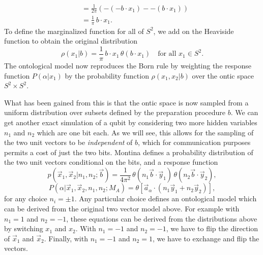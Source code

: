\documentclass[12pt,draft]{article}
\theoremstyle{definition}
\theoremstyle{plain}
\begin{document}
{\begin{align}
            &= \frac{1}{2\pi} \left( 
                -(-b \cdot x_1) - -(b \cdot x_1)
            \right) \\
            &= \frac{1}{\pi} \, b \cdot x_1.
        \end{align}
        To define the marginalized function for all of
        $S^2$, we add on the Heaviside function to obtain
        the original distribution
        \begin{equation}
            \rho(x_1 | b)
            = \frac{1}{\pi} \, b \cdot x_1 \, \theta(b \cdot
            x_1)
            \quad
            \text{for all } x_1 \in S^2.
        \end{equation}
        The ontological model now reproduces the Born rule
        by weighting the response function $P(\alpha|x_1)$ 
        by the probability function $\rho(x_1,x_2|b)$ over
        the ontic space $S^2 \times S^2$.
    }

    What has been gained from this is that the ontic space
    is now sampled from a uniform distribution over subsets
    defined by the preparation procedure $b$. We can get
    another exact simulation of a qubit by considering two
    more hidden variables $n_1$ and $n_2$ which are one bit
    each. As we will see, this allows for the sampling of
    the two unit vectors to be \textit{independent} of $b$,
    which for communication purposes permits a cost of just
    the two bits.  Montina defines a probability
    distribution of the two unit vectors conditional on the
    bits, and a response function
    \begin{equation}
        p(\vec x_1, \vec x_2 | n_1, n_2; \vec b)
        = \frac{1}{4\pi^2} \, \theta(n_1 \vec b \cdot \vec
        y_1) \, \theta(n_2 \vec b \cdot \vec y_2),
    \end{equation}
    \begin{equation}
        P(\alpha | \vec x_1, \vec x_2, n_1, n_2; M_A)
        = \theta\left[\vec a_\alpha \cdot (n_1 \vec y_1 +
        n_2 \vec y_2)\right],
    \end{equation}
    for any choice $n_i = \pm 1$. Any particular choice
    defines an ontological model which can be
    derived from the original two vector model above. For
    example with $n_1 = 1$ and $n_2 = -1$, these equations
    can be derived from the distributions above by switching
    $x_1$ and $x_2$. With $n_1 = -1$ and $n_2 = -1$, we have
    to flip the direction of $\vec x_1$ and $\vec x_2$.
    Finally, with $n_1= -1$ and $n_2 = 1$, we have to
    exchange and flip the vectors.
\end{document}
